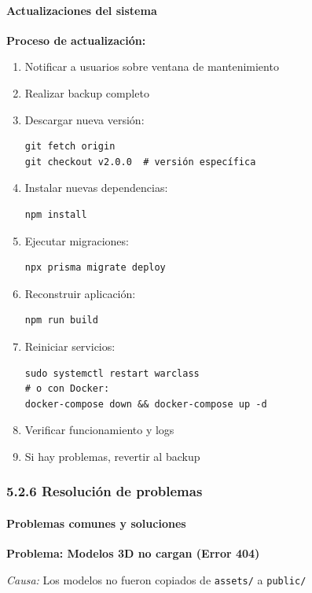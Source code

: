 \paragraph{Actualizaciones del sistema}

\textbf{Proceso de actualización:}

\begin{enumerate}
	\item Notificar a usuarios sobre ventana de mantenimiento
	\item Realizar backup completo
	\item Descargar nueva versión:
\begin{verbatim}
git fetch origin
git checkout v2.0.0  # versión específica
\end{verbatim}
	\item Instalar nuevas dependencias:
\begin{verbatim}
npm install
\end{verbatim}
	\item Ejecutar migraciones:
\begin{verbatim}
npx prisma migrate deploy
\end{verbatim}
	\item Reconstruir aplicación:
\begin{verbatim}
npm run build
\end{verbatim}
	\item Reiniciar servicios:
\begin{verbatim}
sudo systemctl restart warclass
# o con Docker:
docker-compose down && docker-compose up -d
\end{verbatim}
	\item Verificar funcionamiento y logs
	\item Si hay problemas, revertir al backup
\end{enumerate}

\subsubsection{5.2.6 Resolución de problemas}

\paragraph{Problemas comunes y soluciones}

\textbf{Problema: Modelos 3D no cargan (Error 404)}

\textit{Causa:} Los modelos no fueron copiados de \texttt{assets/} a \texttt{public/}

